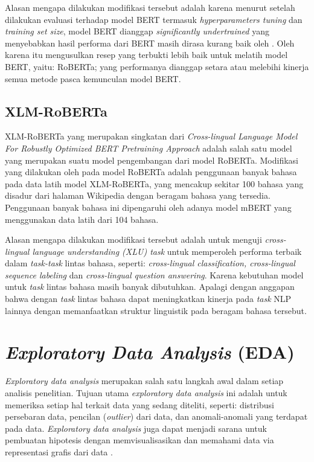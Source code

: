 Alasan mengapa dilakukan modifikasi tersebut adalah karena menurut \citet{liu2019roberta} setelah dilakukan evaluasi terhadap model BERT termasuk \emph{hyperparameters tuning} dan \emph{training set size}, model BERT dianggap \emph{ significantly undertrained} yang menyebabkan hasil performa dari BERT masih dirasa kurang baik oleh \citeauthor{liu2019roberta}. Oleh karena itu \citet{liu2019roberta} mengusulkan resep yang terbukti lebih baik untuk melatih model BERT, yaitu: RoBERTa; yang performanya dianggap setara atau melebihi kinerja semua metode pasca kemunculan model BERT.

\subsection{XLM-RoBERTa}
XLM-RoBERTa yang merupakan singkatan dari \emph{Cross-lingual Language Model For Robustly Optimized BERT Pretraining Approach} adalah salah satu model yang merupakan suatu model pengembangan dari model RoBERTa. Modifikasi yang dilakukan oleh \citet{conneau2020unsupervised} pada model RoBERTa adalah penggunaan banyak bahasa pada data latih model XLM-RoBERTa, yang mencakup sekitar 100 bahasa yang disadur dari halaman Wikipedia dengan beragam bahasa yang tersedia. Penggunaan banyak bahasa ini dipengaruhi oleh adanya model mBERT yang menggunakan data latih dari 104 bahasa.

Alasan mengapa dilakukan modifikasi tersebut adalah untuk menguji \emph{cross-lingual language understanding (XLU) task} untuk  memperoleh performa terbaik dalam \emph{task-task} lintas bahasa, seperti: \emph{cross-lingual classification, cross-lingual sequence labeling} dan \emph{cross-lingual question answering}. Karena kebutuhan model untuk \emph{task} lintas bahasa masih banyak dibutuhkan. Apalagi dengan anggapan bahwa dengan \emph{task} lintas bahasa dapat meningkatkan kinerja pada \emph{task} NLP lainnya dengan memanfaatkan struktur linguistik pada beragam bahasa tersebut.

\section{\emph{Exploratory Data Analysis} (EDA)}
\emph{Exploratory data analysis} merupakan salah satu langkah awal dalam setiap analisis penelitian. Tujuan utama \emph{exploratory data analysis} ini adalah untuk memeriksa setiap hal terkait data yang sedang diteliti, seperti: distribusi persebaran data, pencilan (\emph{outlier}) dari data, dan anomali-anomali yang terdapat pada data. \emph{Exploratory data analysis} juga dapat menjadi sarana untuk pembuatan hipotesis dengan memvisualisasikan dan memahami data via representasi grafis dari data \citep{exploratory-data-analysis}. 

